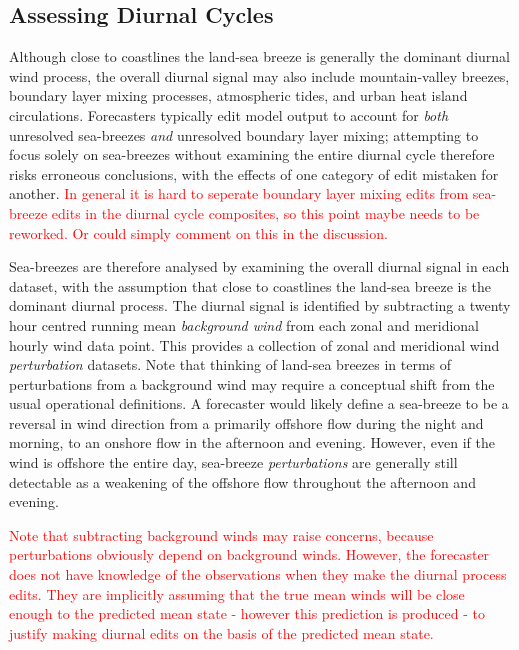 \documentclass[alpha-refs]{wiley-article}
\begin{document}
\subsection{Assessing Diurnal Cycles}
Although close to coastlines the land-sea breeze is generally the dominant diurnal wind process, the overall diurnal signal may also include mountain-valley breezes, boundary layer mixing processes, atmospheric tides, and urban heat island circulations. Forecasters typically edit model output to account for \emph{both} unresolved sea-breezes \emph{and} unresolved boundary layer mixing; attempting to focus solely on sea-breezes without examining the entire diurnal cycle therefore risks erroneous conclusions, with the effects of one category of edit mistaken for another. \textcolor{red}{In general it is hard to seperate boundary layer mixing edits from sea-breeze edits in the diurnal cycle composites, so this point maybe needs to be reworked. Or could simply comment on this in the discussion.}   

Sea-breezes are therefore analysed by examining the overall diurnal signal in each dataset, with the assumption that close to coastlines the land-sea breeze is the dominant diurnal process. The diurnal signal is identified by subtracting a twenty hour centred running mean \textit{background wind} from each zonal and meridional hourly wind data point. This provides a collection of zonal and meridional wind \emph{perturbation} datasets. Note that thinking of land-sea breezes in terms of perturbations from a background wind may require a conceptual shift from the usual operational definitions. A forecaster would likely define a sea-breeze to be a reversal in wind direction from a primarily offshore flow during the night and morning, to an onshore flow in the afternoon and evening. However, even if the wind is offshore the entire day, sea-breeze \emph{perturbations} are generally still detectable as a weakening of the offshore flow throughout the afternoon and evening.

\textcolor{red}{Note that subtracting background winds may raise concerns, because perturbations obviously depend on background winds. However, the forecaster does not have knowledge of the observations when they make the diurnal process edits. They are implicitly assuming that the true mean winds will be close enough to the predicted mean state - however this prediction is produced - to justify making diurnal edits on the basis of the predicted mean state.} 
\end{document}
